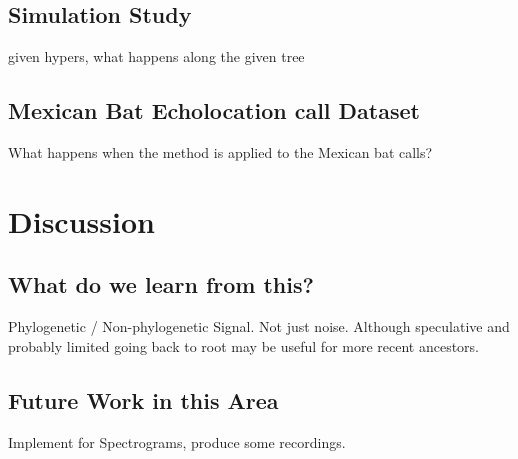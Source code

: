 \documentclass[wsdraft]{ws-rv9x6} %
\begin{document}
\subsection{Simulation Study}

given hypers, what happens along the given tree

\subsection{Mexican Bat Echolocation call Dataset}

What happens when the method is applied to the Mexican bat calls?

\section{Discussion}

\subsection{What do we learn from this?}

Phylogenetic / Non-phylogenetic Signal. Not just noise. Although speculative and probably limited going back to root may be useful for more recent ancestors.

\subsection{Future Work in this Area}

Implement for Spectrograms, produce some recordings.





\end{document}
